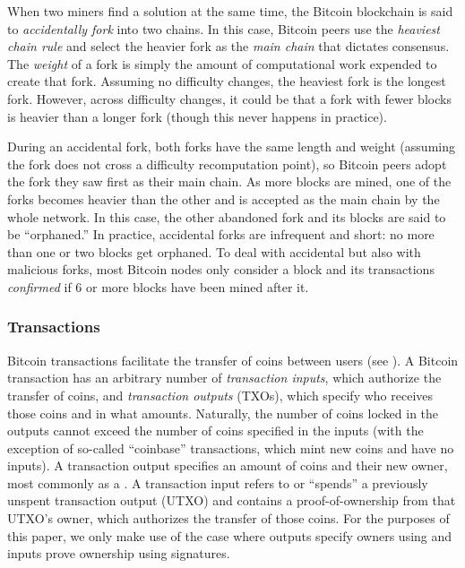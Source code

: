 When two miners find a solution at the same time, the Bitcoin blockchain is said to \emph{accidentally fork} into two chains.
In this case, Bitcoin peers use the \emph{heaviest chain rule} and select the heavier fork as the \emph{main chain} that dictates consensus.
The \emph{weight} of a fork is simply the amount of computational work expended to create that fork.
Assuming no difficulty changes, the heaviest fork is the longest fork.
However, across difficulty changes, it could be that a fork with fewer blocks is heavier than a longer fork (though this never happens in practice).

During an accidental fork, both forks have the same length and weight (assuming the fork does not cross a difficulty recomputation point), so Bitcoin peers adopt the fork they saw first as their main chain.
As more blocks are mined, one of the forks becomes heavier than the other and is accepted as the main chain by the whole network\cite{blockchainproto}.
In this case, the other abandoned fork and its blocks are said to be ``orphaned.''
In practice, accidental forks are infrequent and short: no more than one or two blocks get orphaned.
To deal with accidental but also with malicious forks, most Bitcoin nodes only consider a block and its transactions \emph{confirmed} if 6 or more blocks have been mined after it.

\subsubsection{Transactions}
\label{sec:background:bitcoin:transactions}
Bitcoin transactions facilitate the transfer of coins between users (see ).
A Bitcoin transaction has an arbitrary number of \emph{transaction inputs}, which authorize the transfer of coins, and \emph{transaction outputs} (TXOs), which specify  who receives those coins and in what amounts.
Naturally, the number of coins locked in the outputs cannot exceed the number of coins specified in the inputs (with the exception of so-called ``coinbase'' transactions, which mint new coins and have no inputs).
A transaction output specifies an amount of coins and their new owner, most commonly as a \pk.
A transaction input refers to or ``spends'' a previously unspent transaction output (UTXO) and contains a proof-of-ownership from that UTXO's owner, which authorizes the transfer of those coins.
For the purposes of this paper, we only make use of the case where outputs specify owners using \pks and inputs prove ownership using signatures.

